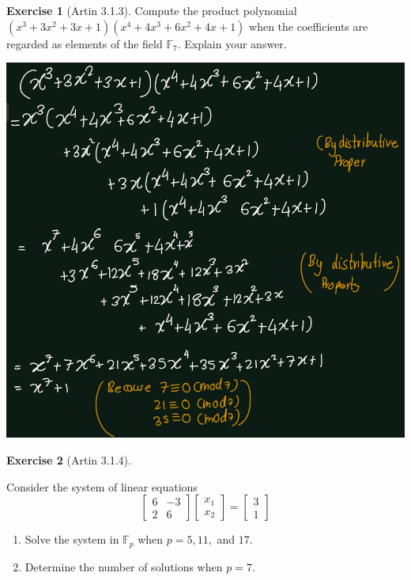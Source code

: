 \documentclass[
]{book}
\providecommand{\tightlist}{%
  \setlength{\itemsep}{0pt}\setlength{\parskip}{0pt}}
\theoremstyle{definition}
\theoremstyle{definition}
\theoremstyle{definition}
\newtheorem{exercise}{Exercise}[chapter]
\theoremstyle{definition}
\theoremstyle{remark}
\begin{document}
\begin{exercise}[Artin 3.1.3]
\protect\hypertarget{exr:unnamed-chunk-256}{}\label{exr:unnamed-chunk-256}Compute the product polynomial \((x^3 + 3x^2 + 3x + 1)(x^4 + 4x^3 + 6x^2 + 4x + 1)\) when the coefficients are regarded as elements of the field \(\mathbb{F}_7\). Explain your answer.
\end{exercise}

\includegraphics{figures/ch_3/ex-1.3.png}

\begin{exercise}[Artin 3.1.4]
\protect\hypertarget{exr:unnamed-chunk-258}{}\label{exr:unnamed-chunk-258}

Consider the system of linear equations
\[\begin{bmatrix}6 & -3\\ 2 & 6\end{bmatrix}
\begin{bmatrix}x_1\\ x_2\end{bmatrix}
=\begin{bmatrix}3\\ 1\end{bmatrix}\]

\begin{enumerate}
\def\labelenumi{\alph{enumi}.}
\tightlist
\item
  Solve the system in \(\mathbb{F}_p\) when \(p = 5, 11,\) and \(17\).
\item
  Determine the number of solutions when \(p = 7\).
\end{enumerate}

\end{exercise}
\end{document}
